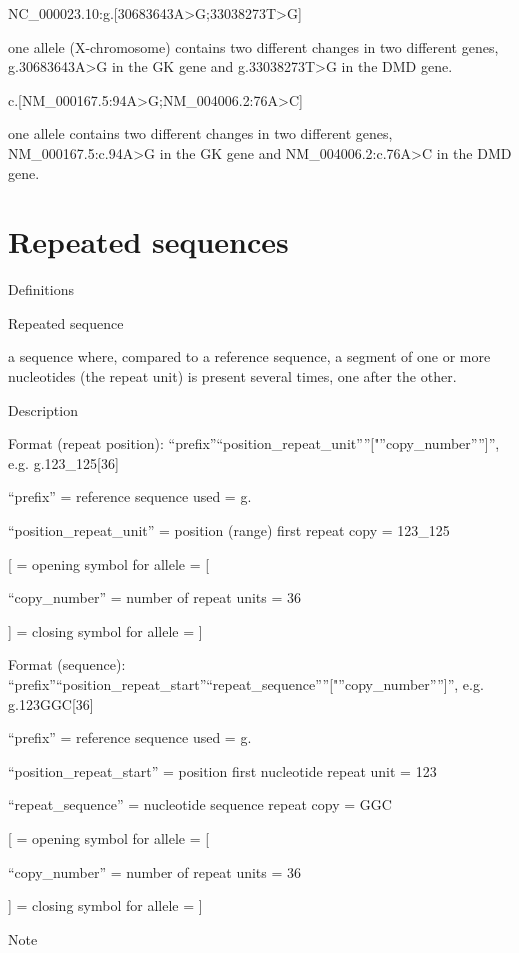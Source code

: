 \documentclass{book}
\begin{document}
	NC\_000023.10:g.[30683643A>G;33038273T>G]

	one allele (X-chromosome) contains two different changes in two different genes, g.30683643A>G in the GK gene and g.33038273T>G in the DMD gene.

	c.[NM\_000167.5:94A>G;NM\_004006.2:76A>C]

	one allele contains two different changes in two different genes, NM\_000167.5:c.94A>G in the GK gene and NM\_004006.2:c.76A>C in the DMD gene.

	

	\section{Repeated sequences}

	Definitions

	Repeated sequence

	a sequence where, compared to a reference sequence, a segment of one or more nucleotides (the repeat unit) is present several times, one after the other.

	

	

	Description

	Format (repeat position): “prefix”“position\_repeat\_unit””["”copy\_number””]”, e.g. g.123\_125[36]

	“prefix” = reference sequence used = g.

	“position\_repeat\_unit” = position (range) first repeat copy = 123\_125

	[ = opening symbol for allele = [

	“copy\_number” = number of repeat units = 36

	] = closing symbol for allele = ]

	Format (sequence): “prefix”“position\_repeat\_start”“repeat\_sequence””["”copy\_number””]”, e.g. g.123GGC[36]

	“prefix” = reference sequence used = g.

	“position\_repeat\_start” = position first nucleotide repeat unit = 123

	“repeat\_sequence” = nucleotide sequence repeat copy = GGC

	[ = opening symbol for allele = [

	“copy\_number” = number of repeat units = 36

	] = closing symbol for allele = ]

	

	Note
\end{document}
